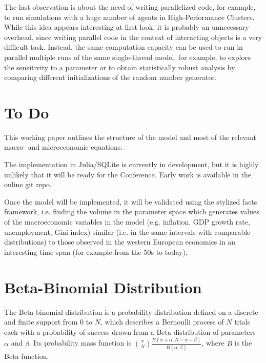 \documentclass[a4paper, headings=standardclasses]{scrartcl}
\begin{document}
The last observation is about the need of writing parallelized code, for example, to run simulations with a huge number of agents in High-Performance Clusters. While this idea appears interesting at first look, it is probably an unnecessary overhead, since writing parallel code in the context of interacting objects is a very difficult task.
Instead, the same computation capacity can be used to run in parallel multiple runs of the same single-thread model, for example, to explore the sensitivity to a parameter or to obtain statistically robust analysis by comparing different initializations of the random number generator.

\section*{To Do}
This working paper outlines the structure of the model and most of the relevant macro- and microeconomic equations.

The implementation in Julia/SQLite is currently in development, but it is highly unlikely that it will be ready for the Conference. Early work is available in the online git repo.

Once the model will be implemented, it will be validated using the stylized facts framework, i.e. finding the volume in the parameter space which generates values of the macroeconomic variables in the model (e.g. inflation, GDP growth rate, unemployment, Gini index) similar (i.e. in the same intervals with comparable distributions) to those observed in the western European economies in an interesting time-span (for example from the 50s to today).


\clearpage

\printbibliography

\clearpage

\appendix

\section{Beta-Binomial Distribution}
\label{sec:beta-binomial}
The Beta-binomial distribution is a probability distribution defined on a discrete and finite support from $0$ to $N$, which describes a Bernoulli process of $N$ trials each with a probability of success drawn from a Beta distribution of parameters $\alpha$ and $\beta$.
Its probability mass function is $\binom{x}{N}\frac{B(x+\alpha, N-x+\beta)}{B(\alpha,\beta)}$, where $B$ is the Beta function.
\end{document}
